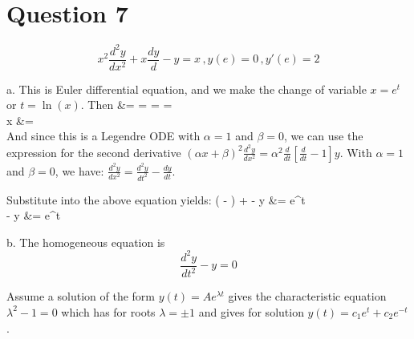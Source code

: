 \documentclass[12pt,twoside]{article}
\begin{document}
\ee


\section*{Question 7}
\[
	x^2 \frac{d^2 y}{dx^2} + x \frac{dy}{d} - y = x \, , y(e) = 0 \, , y'(e) = 2
\]

\be 
\item [a.]
This is Euler differential equation, and we make the change of variable $x=e^t$ or $t=\ln(x)$.
Then
\ba
	 &=   =   =    =     \\ 
	x   &=  \\
\ea
And since this is a Legendre ODE with $\alpha=1$ and $\beta=0$, we can use the expression for the second derivative 
$(\alpha x + \beta)^2 \frac{d^2y}{dx^2} = \alpha^2 \frac{d}{d t} [\frac{d}{dt} - 1] y$.
With $\alpha=1$ and $\beta=0$, we have: $ \frac{d^2y}{dx^2} =  \frac{d^2y}{dt^2} - \frac{dy}{dt}$. \\ \hfill \break

Substitute into the above equation yields:
\ba
	(  - ) +  - y &= e^t \\
	  - y &= e^t \\
\ea

\item [b.]
The homogeneous equation is
\[
	 \frac{d^2y}{dt^2} - y = 0
\]

Assume a solution of the form $y(t) = A e^{\lambda t}$ gives the characteristic equation $\lambda^2 - 1 = 0$ which has for roots $\lambda = \pm1$ and gives
for solution $y(t) = c_1 e^t + c_2 e^{-t}$.
\end{document}
